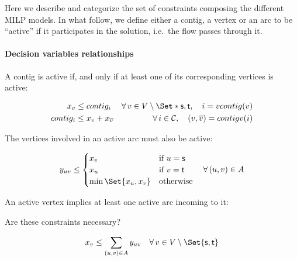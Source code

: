 Here we describe and categorize the set of constraints composing the different MILP models.
In what follow, we define either a contig, a vertex or an arc to be \enquote{active} if it participates in the solution, i.e.\ the flow passes through it.

\paragraph{Decision variables relationships}

A contig is active if, and only if at least one of its corresponding vertices is active:
\begin{Constraint}
  \begin{align}
    x_v & \leq \contig{i} & \forall v \in V \setminus \Set*{\source{}, \sink{}}, \quad i = vcontig(v) \label{pbf_iterbin:milp:cst:dvar:active_vertex_implies_active_contig} \\ %
    \contig{i} & \leq x_v + x_{\rev{v}} & \forall i \in \Contigs{}, \quad (v, \rev{v}) = contigv(i) \label{pbf_iterbin:milp:cst:dvar:active_contig_implies_active_vertex} %
  \end{align}
\end{Constraint}

The vertices involved in an active arc must also be active:
\begin{Constraint}
  \begin{equation}
    y_{uv} \leq
    \begin{cases}
      x_v & \text{if \(u = \source{}\)} \\
      x_u & \text{if \(v = \sink{}\)} \\
      \min\Set{x_u, x_v} & \text{otherwise}
    \end{cases} \quad \forall (u, v) \in A %
    \label{pbf_iterbin:milp:cst:dvar:active_arc_active_vertices} %
  \end{equation}
\end{Constraint}

An active vertex implies at least one active arc incoming to it:
\begin{questionbox}
  Are these constraints necessary?
\end{questionbox}
\begin{Constraint}
  \begin{equation}\label{pbf_iterbin:milp:cst:dvar:active_vertex_active_incoming_arcs} %
    x_v \leq \sum_{(u, v) \in A} y_{u v} \quad \forall v \in V \setminus \Set{\source{}, \sink{}}
  \end{equation}
\end{Constraint}

